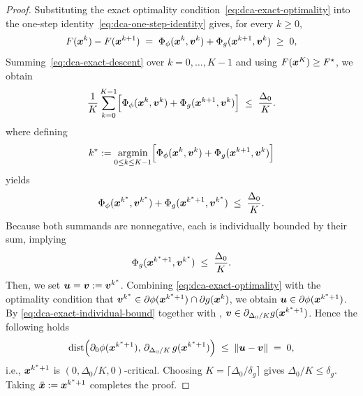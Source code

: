 \documentclass[english]{article}
\begin{document}
\begin{proof}
Substituting the exact optimality condition~\eqref{eq:dca-exact-optimality}
into the one-step identity~\eqref{eq:dca-one-step-identity} gives, for
every $k\ge0$,
\begin{equation}
    F(\bm{x}^k)-F(\bm{x}^{k+1})
    \;=\;
    \Phi_\phi(\bm{x}^k,\bm{v}^k)+\Phi_g(\bm{x}^{k+1},\bm{v}^k)
    \;\ge\;0,
    \label{eq:dca-exact-descent}
\end{equation}
Summing~\eqref{eq:dca-exact-descent} over $k=0,\ldots,K-1$
and using $F(\bm{x}^K)\ge F^\star$, we obtain
\[
    \frac1K\sum_{k=0}^{K-1}
    \Bigl[
        \Phi_\phi(\bm{x}^k,\bm{v}^k)+\Phi_g(\bm{x}^{k+1},\bm{v}^k)
    \Bigr]
    \;\le\;
    \frac{\Delta_0}{K}.
\] where defining
\[
    k^*:=\operatorname*{\mathrm{argmin}}_{0\le k\le K-1}
    \Bigl[
        \Phi_\phi(\bm{x}^k,\bm{v}^k)+\Phi_g(\bm{x}^{k+1},\bm{v}^k)
    \Bigr]
\]
yields
\[
    \Phi_\phi(\bm{x}^{k^*},\bm{v}^{k^*})+\Phi_g(\bm{x}^{k^*+1},\bm{v}^{k^*})
    \;\le\;\frac{\Delta_0}{K}.
\]
Because both summands are nonnegative, each is individually bounded by
their sum, implying
\begin{equation}
    \Phi_g(\bm{x}^{k^*+1},\bm{v}^{k^*})\;\le\;\frac{\Delta_0}{K}.
    \label{eq:dca-exact-individual-bound}
\end{equation}
Then, we set $\bm{u}=\bm{v}:=\bm{v}^{k^*}$. Combining
\eqref{eq:dca-exact-optimality} with the optimality condition that $\bm{v}^{k^*}\in\partial\phi(\bm{x}^{k^*+1})\cap\partial g(\bm{x}^k)$, we obtain $\bm{u}\in\partial\phi(\bm{x}^{k^*+1})$. By
\eqref{eq:dca-exact-individual-bound} together with
, $\bm{v}\in\partial_{\Delta_0/K}g(\bm{x}^{k^*+1})$.
Hence the following holds
\[
    \operatorname{dist}
    \Bigl(
        \partial_{0}\phi(\bm{x}^{k^*+1}),\,
        \partial_{\Delta_0/K}\,g(\bm{x}^{k^*+1})
    \Bigr)
    \;\le\;
    \|\bm{u}-\bm{v}\|
    \;=\;
    0,
\] i.e., $\bm{x}^{k^*+1}$ is $(0,\Delta_0/K,0)$-critical. Choosing $K=\lceil\Delta_0/\delta_g\rceil$ gives $\Delta_0/K\le\delta_g$.
Taking $\bar{\bm{x}}:=\bm{x}^{k^*+1}$ completes the proof.
\end{proof}
\end{document}
